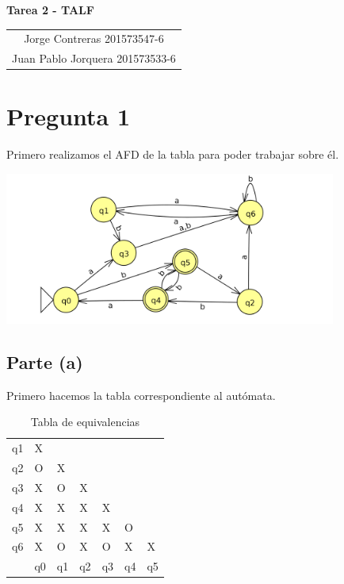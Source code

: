 \documentclass[11pt,letterpaper]{article}
\newcommand{\titulo}{Tarea 2 - TALF}
\newcommand{\integrantes}{\begin{tabular}{c}
Jorge Contreras 201573547-6 \\
Juan Pablo Jorquera  201573533-6 \\
\end{tabular}}
\renewcommand{\maketitle}
{
\thispagestyle{fancy}
\begin{center}
\begin{Large}
\textbf{\titulo}\\
\end{Large}
\vspace{0.5cm}
\integrantes
\end{center}
\vspace{0.3cm}
}
\begin{document}
\maketitle

\section{Pregunta 1}
Primero realizamos el AFD de la tabla para poder trabajar sobre él.

\includegraphics[height=5cm]{tarea_1.png}
\subsection{Parte (a)}
Primero hacemos la tabla correspondiente al autómata.

\begin{table}[h]
\centering
\label{tabla_min}
\begin{tabular}{lllllll}
q1 & X  &    &    &    &    &    \\
q2 & O  & X  &    &    &    &    \\
q3 & X  & O  & X  &    &    &    \\
q4 & X  & X  & X  & X  &    &    \\
q5 & X  & X  & X  & X  & O  &    \\
q6 & X  & O  & X  & O  & X  & X  \\
   & q0 & q1 & q2 & q3 & q4 & q5
\end{tabular}
\caption{Tabla de equivalencias}
\end{table}
\end{document}
